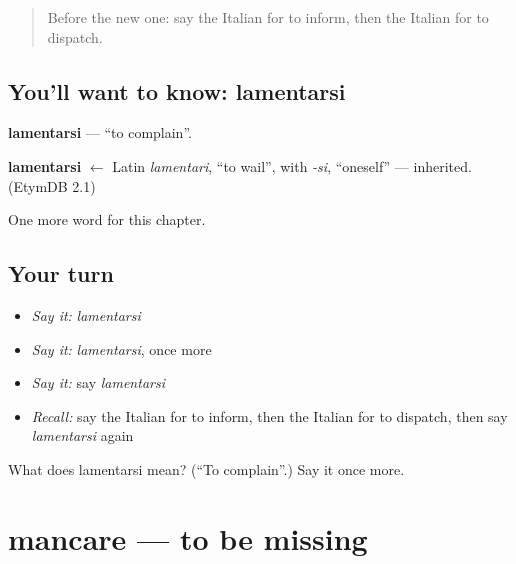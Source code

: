 \label{lesson:IT-C238-lamentarsi}



\begin{quote}
Before the new one: say the Italian for to inform, then the Italian for to dispatch.
\end{quote}

\subsection*{You'll want to know: lamentarsi}
\textbf{lamentarsi} — \textquotedblleft{}to complain\textquotedblright{}.

\begin{cousinweb}
\textbf{lamentarsi} $\leftarrow$ Latin \emph{lamentari}, \textquotedblleft{}to wail\textquotedblright{}, with \emph{-si}, \textquotedblleft{}oneself\textquotedblright{} — inherited. (EtymDB 2.1)
\end{cousinweb}

\begin{grammarlens}[title={What you've built}]
One more word for this chapter.
\end{grammarlens}

\subsection*{Your turn}
\begin{itemize}
\raggedright
  \item \emph{Say it:} \emph{lamentarsi}
  \item \emph{Say it:} \emph{lamentarsi}, once more
  \item \emph{Say it:} say \emph{lamentarsi}
  \item \emph{Recall:} say the Italian for to inform, then the Italian for to dispatch, then say \emph{lamentarsi} again
\end{itemize}

\begin{tcolorbox}[breakable,colback=teal!4,colframe=teal!35!black,title={Before you move on}]
What does lamentarsi mean? (\textquotedblleft{}To complain\textquotedblright{}.) Say it once more.
\end{tcolorbox}
\section[mancare]{mancare — to be missing}

\label{lesson:IT-C238-mancare}



